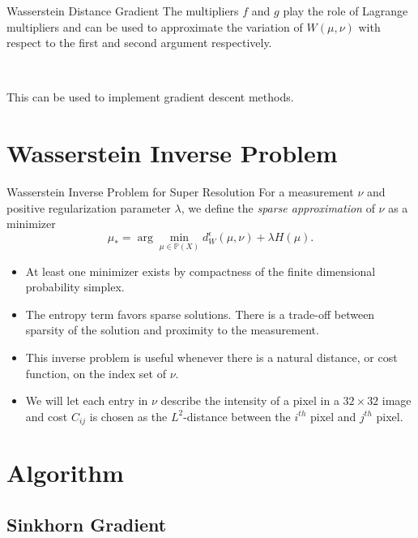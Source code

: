 \documentclass{beamer}
\newcommand{\bbP}{{\mathbb{P}}}
\begin{document}
\begin{frame}{Wasserstein Distance Gradient}
    The multipliers $f$ and $g$ play the role of Lagrange multipliers and can be used to approximate the variation of $W(\mu,\nu)$ with respect to the first and second argument respectively. 
    \pause
    
    ~
    
    This can be used to implement gradient descent methods. 
\end{frame}

\section{Wasserstein Inverse Problem}

\begin{frame}{Wasserstein Inverse Problem for Super Resolution}
\vspace{-5ex}
    For a measurement $\nu$ and positive regularization parameter $\lambda$, we define the \emph{sparse approximation} of $\nu$ as a minimizer 
\begin{equation}
    \mu_* = \arg\min_{\mu \in \bbP(X)} d_W^\epsilon(\mu,\nu) + \lambda H(\mu).
    \label{eq:sparseNeigh}
\end{equation}
\vspace{-4ex}
\small
\pause
\begin{itemize}
    \item At least one minimizer exists by compactness of the finite dimensional probability simplex. 
\pause
    \item The entropy term favors sparse solutions. There is a trade-off between sparsity of the solution and proximity to the measurement. 
\pause
    \item This inverse problem is useful whenever there is a natural distance, or cost function, on the index set of $\nu$. 
\pause
    \item We will let each entry in $\nu$ describe the intensity of a pixel in a $32\times 32$ image and cost $C_{ij}$ is chosen as the $L^2$-distance between the $i^{th}$ pixel and $j^{th}$ pixel.
\end{itemize}

\end{frame}

\section{Algorithm}

\subsection{Sinkhorn Gradient}
\end{document}
